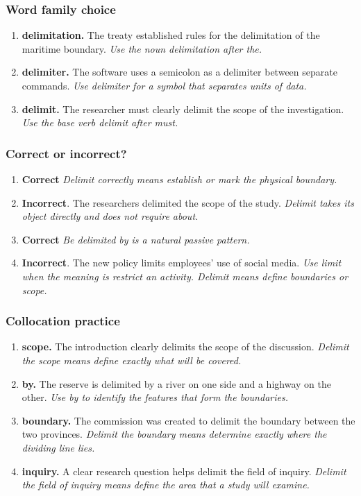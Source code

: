 \documentclass[11pt]{article}
\begin{document}
\subsubsection{Word family choice}
\begin{enumerate}
  \item \textbf{delimitation.} The treaty established rules for the delimitation of the maritime boundary. \emph{Use the noun delimitation after the.}
  \item \textbf{delimiter.} The software uses a semicolon as a delimiter between separate commands. \emph{Use delimiter for a symbol that separates units of data.}
  \item \textbf{delimit.} The researcher must clearly delimit the scope of the investigation. \emph{Use the base verb delimit after must.}
\end{enumerate}

\subsubsection{Correct or incorrect?}
\begin{enumerate}
  \item \textbf{Correct} \emph{Delimit correctly means establish or mark the physical boundary.}
  \item \textbf{Incorrect}. The researchers delimited the scope of the study. \emph{Delimit takes its object directly and does not require about.}
  \item \textbf{Correct} \emph{Be delimited by is a natural passive pattern.}
  \item \textbf{Incorrect}. The new policy limits employees' use of social media. \emph{Use limit when the meaning is restrict an activity. Delimit means define boundaries or scope.}
\end{enumerate}

\subsubsection{Collocation practice}
\begin{enumerate}
  \item \textbf{scope.} The introduction clearly delimits the scope of the discussion. \emph{Delimit the scope means define exactly what will be covered.}
  \item \textbf{by.} The reserve is delimited by a river on one side and a highway on the other. \emph{Use by to identify the features that form the boundaries.}
  \item \textbf{boundary.} The commission was created to delimit the boundary between the two provinces. \emph{Delimit the boundary means determine exactly where the dividing line lies.}
  \item \textbf{inquiry.} A clear research question helps delimit the field of inquiry. \emph{Delimit the field of inquiry means define the area that a study will examine.}
\end{enumerate}
\end{document}
